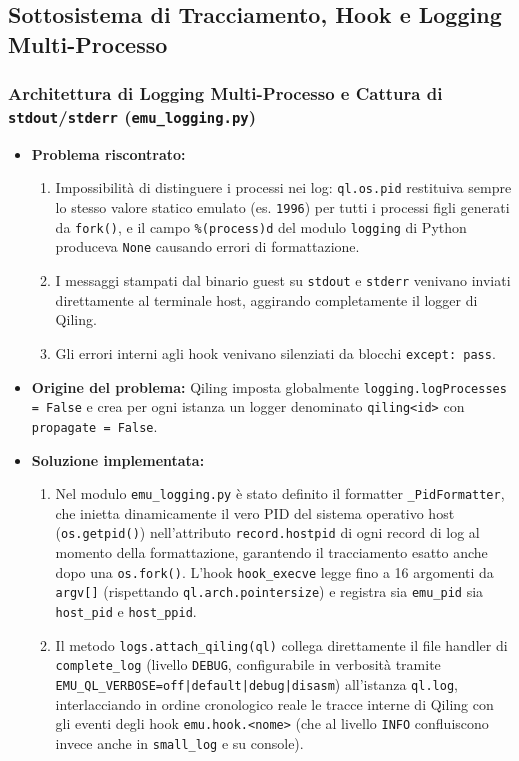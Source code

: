 \documentclass[11pt,a4paper]{article}
\begin{document}
\subsection{Sottosistema di Tracciamento, Hook e Logging Multi-Processo}
\subsubsection{Architettura di Logging Multi-Processo e Cattura di \texttt{stdout}/\texttt{stderr} (\texttt{emu\_logging.py})}
\begin{itemize}
    \item \textbf{Problema riscontrato:}
    \begin{enumerate}
        \item Impossibilità di distinguere i processi nei log: \texttt{ql.os.pid} restituiva sempre lo stesso valore statico emulato (es. \texttt{1996}) per tutti i processi figli generati da \texttt{fork()}, e il campo \texttt{\%(process)d} del modulo \texttt{logging} di Python produceva \texttt{None} causando errori di formattazione.
        \item I messaggi stampati dal binario guest su \texttt{stdout} e \texttt{stderr} venivano inviati direttamente al terminale host, aggirando completamente il logger di Qiling.
        \item Gli errori interni agli hook venivano silenziati da blocchi \texttt{except: pass}.
    \end{enumerate}
    \item \textbf{Origine del problema:} Qiling imposta globalmente \texttt{logging.logProcesses = False} e crea per ogni istanza un logger denominato \texttt{qiling<id>} con \texttt{propagate = False}.
    \item \textbf{Soluzione implementata:}
    \begin{enumerate}
        \item Nel modulo \texttt{emu\_logging.py} è stato definito il formatter \texttt{\_PidFormatter}, che inietta dinamicamente il vero PID del sistema operativo host (\texttt{os.getpid()}) nell'attributo \texttt{record.hostpid} di ogni record di log al momento della formattazione, garantendo il tracciamento esatto anche dopo una \texttt{os.fork()}. L'hook \texttt{hook\_execve} legge fino a 16 argomenti da \texttt{argv[]} (rispettando \texttt{ql.arch.pointersize}) e registra sia \texttt{emu\_pid} sia \texttt{host\_pid} e \texttt{host\_ppid}.
        \item Il metodo \texttt{logs.attach\_qiling(ql)} collega direttamente il file handler di \texttt{complete\_log} (livello \texttt{DEBUG}, configurabile in verbosità tramite \texttt{EMU\_QL\_VERBOSE=off|default|debug|disasm}) all'istanza \texttt{ql.log}, interlacciando in ordine cronologico reale le tracce interne di Qiling con gli eventi degli hook \texttt{emu.hook.<nome>} (che al livello \texttt{INFO} confluiscono invece anche in \texttt{small\_log} e su console).

\end{enumerate}
\end{itemize}
\end{document}

